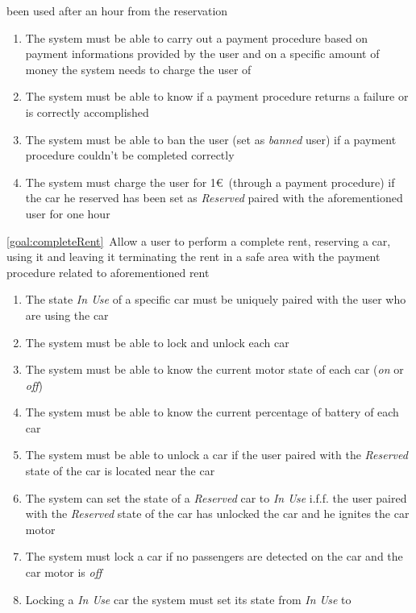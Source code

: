 \begin{description}
  		been used after an hour from the reservation
  			\begin{enumerate}[resume*]
  				\item The system must be able to carry out a payment procedure based on payment
  				informations provided by the user and on a specific amount of money the system needs to
  				charge the user of
  				\item The system must be able to know if a payment procedure returns a failure or is
  				correctly accomplished
  				\item The system must be able to ban the user (set as \textit{banned} user) if a payment
  				procedure couldn't be completed correctly
  				\item The system must charge the user for 1\euro\ (through a payment procedure) if the
  				car he reserved has been set as \textit{Reserved} paired with the aforementioned user for
  				one hour
   			\end{enumerate}
  		\item \ref{goal:completeRent}\ Allow a user to perform a complete rent, reserving a car, using
  		it and leaving it terminating the rent in a safe area with the payment procedure related to
  		aforementioned rent
  			\begin{enumerate}[resume*]
  			    \item The state \textit{In Use} of a specific car must be uniquely paired with the user who
  				are using the car	
  				\item The system must be able to lock and unlock each car
  				\item The system must be able to know the current motor state of each car (\textit{on}
  				or \textit{off})
  				\item The system must be able to know the current percentage of battery of each car
  				\item The system must be able to unlock a car if the user paired with the
  				\textit{Reserved} state of the car is located near  the car
  				\item The system can set the state of a \textit{Reserved} car to \textit{In Use} i.f.f. the
  				user paired with the \textit{Reserved} state of the car has unlocked the car and he ignites
  				the car motor
  				\item The system must lock a car if no passengers are detected on the car and the car
  				motor is \textit{off}
  				\item Locking a \textit{In Use} car the system must set its state from \textit{In Use} to

\end{enumerate}
\end{description}
